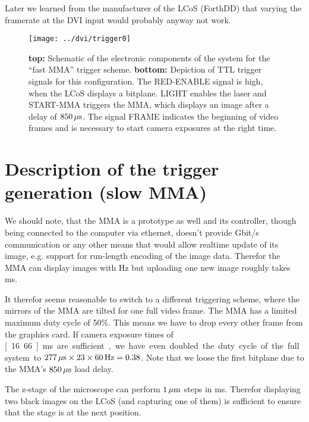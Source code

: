 Later we learned from the manufacturer of the LCoS (ForthDD) that
varying the framerate at the DVI input would probably anyway not work.

\begin{figure}[!hbt]
  \centering
  \texttt{[image: ../dvi/trigger0]}
  \caption{{\bf top:} Schematic of the electronic components of the
    system for the ``fast MMA'' trigger scheme. {\bf bottom:}
    Depiction of TTL trigger signals for this configuration. The
    \textsf{RED-ENABLE} signal is high, when the LCoS displays a
    bitplane. \textsf{LIGHT} enables the laser and \textsf{START-MMA}
    triggers the MMA, which displays an image after a delay of
    $\unit[850]{\mu s}$. The signal \textsf{FRAME} indicates the
    beginning of video frames and is necessary to start camera
    exposures at the right time.}
  \label{fig:trigger0}
\end{figure}


\section{Description of the trigger generation (slow MMA)}
We should note, that the MMA is a prototype as well and its
controller, though being connected to the computer via ethernet,
doesn't provide \unit[1]{Gbit/s} communication or any other means that
would allow realtime update of its image, e.g. support for run-length
encoding of the image data. Therefor the MMA can display images with
\unit[660]{Hz} but uploading one new image roughly takes
\unit[80]{ms}.

It therefor seems reasonable to switch to a different triggering
scheme, where the mirrors of the MMA are tilted for one full video
frame. The MMA has a limited maximum duty cycle of 50\%. This means we
have to drop every other frame from the graphics card. If camera
exposure times of \unit[16.66]{ms} are sufficient, we have even
doubled the duty cycle of the full system to $\unit[277]{\mu
  s}\times23\times\unit[60]{Hz}=0.38$. Note that we loose the first
bitplane due to the MMA's $\unit[850]{\mu s}$ load delay.

The z-stage of the microscope can perform $\unit[1]{\mu m}$ steps in
\unit[20]{ms}. Therefor displaying two black images on the LCoS (and
capturing one of them) is sufficient to ensure that the stage is at
the next position.

